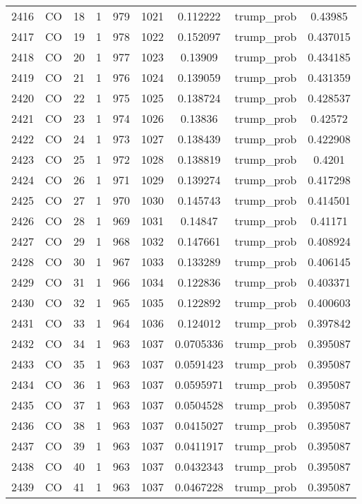 \documentclass[12pt,a4paper]{article}
\begin{document}
\begin{tabular}{r|cccccccc}
	2416 & CO & 18 & 1 & 979 & 1021 & 0.112222 & trump\_prob & 0.43985 \\
	2417 & CO & 19 & 1 & 978 & 1022 & 0.152097 & trump\_prob & 0.437015 \\
	2418 & CO & 20 & 1 & 977 & 1023 & 0.13909 & trump\_prob & 0.434185 \\
	2419 & CO & 21 & 1 & 976 & 1024 & 0.139059 & trump\_prob & 0.431359 \\
	2420 & CO & 22 & 1 & 975 & 1025 & 0.138724 & trump\_prob & 0.428537 \\
	2421 & CO & 23 & 1 & 974 & 1026 & 0.13836 & trump\_prob & 0.42572 \\
	2422 & CO & 24 & 1 & 973 & 1027 & 0.138439 & trump\_prob & 0.422908 \\
	2423 & CO & 25 & 1 & 972 & 1028 & 0.138819 & trump\_prob & 0.4201 \\
	2424 & CO & 26 & 1 & 971 & 1029 & 0.139274 & trump\_prob & 0.417298 \\
	2425 & CO & 27 & 1 & 970 & 1030 & 0.145743 & trump\_prob & 0.414501 \\
	2426 & CO & 28 & 1 & 969 & 1031 & 0.14847 & trump\_prob & 0.41171 \\
	2427 & CO & 29 & 1 & 968 & 1032 & 0.147661 & trump\_prob & 0.408924 \\
	2428 & CO & 30 & 1 & 967 & 1033 & 0.133289 & trump\_prob & 0.406145 \\
	2429 & CO & 31 & 1 & 966 & 1034 & 0.122836 & trump\_prob & 0.403371 \\
	2430 & CO & 32 & 1 & 965 & 1035 & 0.122892 & trump\_prob & 0.400603 \\
	2431 & CO & 33 & 1 & 964 & 1036 & 0.124012 & trump\_prob & 0.397842 \\
	2432 & CO & 34 & 1 & 963 & 1037 & 0.0705336 & trump\_prob & 0.395087 \\
	2433 & CO & 35 & 1 & 963 & 1037 & 0.0591423 & trump\_prob & 0.395087 \\
	2434 & CO & 36 & 1 & 963 & 1037 & 0.0595971 & trump\_prob & 0.395087 \\
	2435 & CO & 37 & 1 & 963 & 1037 & 0.0504528 & trump\_prob & 0.395087 \\
	2436 & CO & 38 & 1 & 963 & 1037 & 0.0415027 & trump\_prob & 0.395087 \\
	2437 & CO & 39 & 1 & 963 & 1037 & 0.0411917 & trump\_prob & 0.395087 \\
	2438 & CO & 40 & 1 & 963 & 1037 & 0.0432343 & trump\_prob & 0.395087 \\
	2439 & CO & 41 & 1 & 963 & 1037 & 0.0467228 & trump\_prob & 0.395087 \\

\end{tabular}
\end{document}
